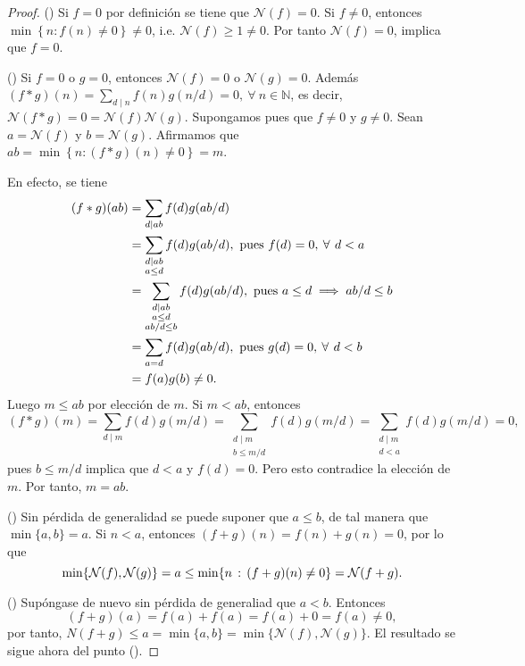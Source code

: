 \begin{proof}
({\scshape {}}) Si $f=0$ por definición se tiene que $\mathcal{N}(f)=0$. Si $f \neq 0$, entonces $\min \left\{n : f(n) \neq 0\right\}\neq 0$, i.e. $\mathcal{N}(f)\geq 1\neq 0$. Por tanto $\mathcal{N}(f)=0$, implica que $f=0$.
\bigskip

({\scshape {}}) Si $f=0$ o $g=0$, entonces $\mathcal{N}(f)=0$ o $\mathcal{N}(g)=0$. Además $(f*g)(n)=\sum_{d \mid n} f(n)g(n/d)=0, \:\forall\: n \in\mathbb{N}$, es decir, $\mathcal{N}(f*g)=0=\mathcal{N}(f)\mathcal{N}(g)$. Supongamos pues que $f \neq 0$ y $g \neq 0$. Sean $a=\mathcal{N}(f)$ y $b=\mathcal{N}(g)$. Afirmamos que $a b=\min \left\{n : (f*g)(n) \ne 0\right\}=m$.
\bigskip

En efecto, se tiene
\begin{align*}
	(f*g)(a b) &= \sum_{d \mid a b} f(d)g(a b/d) \\
			   &= \sum_{\substack{d \mid a b \\ a \leq d}} f(d)g(a b/d), \textnormal{ pues }f(d)=0, \:\forall\: d<a \\
			   &= \sum_{\substack{d \mid a b \\ a \leq d \\ a b/d \leq b}} f(d) g(a b/d), \textnormal{ pues }a \leq d \implies a b/d \leq b \\
			   &= \sum_{a=d} f(d)g(a b/d), \textnormal{ pues }g(d)=0, \:\forall\: d<b \\
			   &= f(a)g(b)\neq 0.
\end{align*}
Luego $m \leq a b$ por elección de $m$. Si $m < a b$, entonces
\begin{equation*}
	(f * g)(m) = \sum_{d \mid m} f(d) g(m/d) = \sum_{\substack{d \mid m \\ b \le m/d}} f(d) g(m/d) = \sum_{\substack{d \mid m \\ d<a}} f(d) g(m/d) = 0,
\end{equation*}
pues $b \le m/d$ implica que $d<a$ y $f(d)=0$. Pero esto contradice la elección de $m$. Por tanto, $m=a b$.

\bigskip

({\scshape {}}) Sin pérdida de generalidad se puede suponer que $a \le b$, de tal manera que $\min \{ a,b \} = a$. Si $n<a$, entonces $(f+g)(n) = f(n) + g(n) = 0$, por lo que
\begin{equation*}
    \min \{ \mathcal{N}(f),\mathcal{N}(g) \}=a \le \min \{ n \, : \, (f+g)(n) \ne 0 \}=\mathcal{N}(f+g).
\end{equation*}

({\scshape {}}) Supóngase de nuevo sin pérdida de generaliad que $a<b$. Entonces
\begin{equation*}
	(f+g)(a) = f(a) + f(a) = f(a) + 0 = f(a) \ne 0,
\end{equation*}
por tanto, $N(f+g) \le a = \min \{ a,b \}=\min \{ \mathcal{N}(f),\mathcal{N}(g) \}$. El resultado se sigue ahora del punto ({\scshape {}}).

\end{proof}
